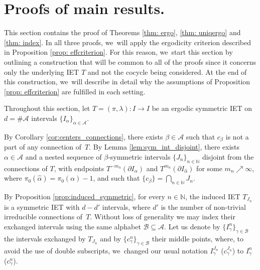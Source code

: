 \documentclass[JEP,XML,SOM,Unicode,NoEqCountersInSection,NoFloatCountersInSection,published]{cedram}
\theoremstyle{plain}
\theoremstyle{definition}
\newcommand{\A}{\mathcal{A}}
\newcommand{\B}{\mathcal{B}}
\newcommand{\N}{\mathbb{N}}
\begin{document}
\section{Proofs of main results.}

This section contains the proof of Theorems \ref{thm: ergo}, \ref{thm: uniqergo} and \ref{thm: index}. In all three proofs, we~will apply the ergodicity criterion described in Proposition \ref{prop: effcriterion}. For this reason, we~start this section by outlining a construction that will be common to all of the proofs since it concerns only the underlying IET $T$ and not the cocycle being considered. At the end of this construction, we~will describe in detail why the assumptions of Proposition \ref{prop: effcriterion} are fulfilled in each setting.

Throughout this section, let $T=(\pi,\lambda): I \to I$ be an ergodic symmetric IET on $d = \#\A$ intervals $\{I_\alpha\}_{\alpha \in \A}$.

By Corollary \ref{cor:centers_connections}, there exists $\beta \in \A$ such that $c_{\beta}$ is not a part of any connection of~$T$. By Lemma \ref{lem:sym_int_disjoint}, there exists $\alpha \in \A$ and a nested sequence of $\beta$-symmetric intervals $\{J_n\}_{n \in \N}$ disjoint from the connections of $T$, with endpoints $T^{-m_n}(\partial I_{\alpha})$ and $T^{m_n}(\partial I_{\hat\alpha})$ for some $m_n \nearrow \infty$, where $\pi_0(\hat\alpha) = \pi_0(\alpha)-1$, and such that $\{c_\beta\} = \bigcap_{n \in \N} J_n$.

By Proposition \ref{prop:induced_symmetric}, for every $n\in\N$, the induced IET $T_{J_n}$ is a symmetric IET with $d - d'$ intervals, where $d'$ is the number of non-trivial irreducible connections of~$T$. Without loss of generality we may index their exchanged intervals using the same alphabet $\B \subseteq \A$. Let us denote by $\{I_\gamma^n\}_{\gamma \in \B}$ the intervals exchanged by $T_{J_n}$ and by $\{c_\gamma^n\}_{\gamma \in \B}$ their middle points, where, to avoid the use of double subscripts, we~changed our usual notation $I_\gamma^{J_n}$ (\resp $c_\gamma^{J_n}$) to $I_\gamma^n$ (\resp $c_\gamma^n$).
\end{document}
